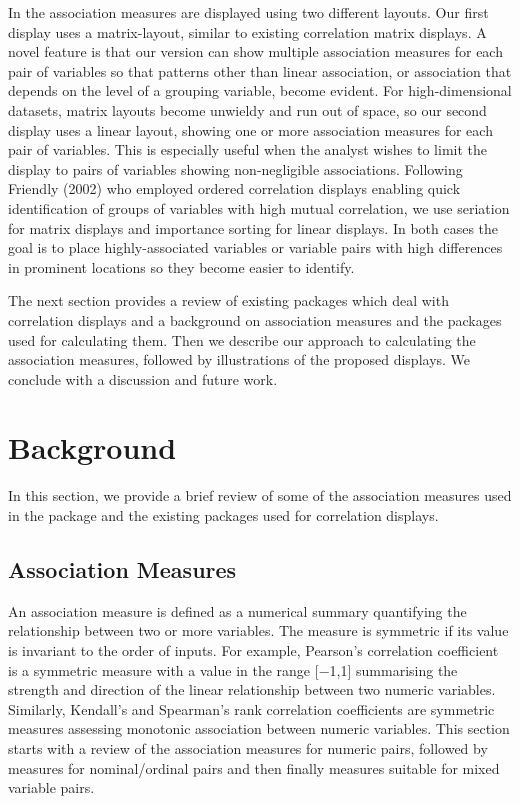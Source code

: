 In  the association measures are displayed using two different layouts. Our first display uses a matrix-layout, similar to existing correlation matrix displays. A novel feature is that our version can show multiple association measures for each pair of variables so that patterns other than linear association, or association that depends on the level of a grouping variable, become evident. For high-dimensional datasets, matrix layouts become unwieldy and run out of space, so our second display uses a linear layout, showing one or more association measures for each pair of variables. This is especially useful when the analyst wishes to limit the display to pairs of variables showing non-negligible associations.
Following Friendly (2002) who employed ordered correlation displays enabling quick identification of groups of variables with high mutual correlation, we use seriation for matrix displays and importance sorting for linear displays. In both cases the goal is to place highly-associated variables or variable pairs with high differences in prominent locations so they become easier to identify.

The next section provides a review of existing packages which deal with correlation displays and a background on association measures and the packages used for calculating them. Then we describe our approach to calculating the association measures, followed by illustrations of the proposed displays. We conclude with a discussion and future work.

\hypertarget{background}{%
\section{Background}\label{background}}

In this section, we provide a brief review of some of the association measures used in the package  and the existing packages used for correlation displays.

\hypertarget{association-measures}{%
\subsection{Association Measures}\label{association-measures}}

An association measure is defined as a numerical summary quantifying the relationship between two or more variables. The measure is symmetric if its value is invariant to the order of inputs. For example, Pearson's correlation coefficient is a symmetric measure with a value in the range {[}−1,1{]} summarising the strength and direction of the linear relationship between two numeric variables. Similarly, Kendall's and Spearman's rank correlation coefficients are symmetric measures assessing monotonic association between numeric variables. This section starts with a review of the association measures for numeric pairs, followed by measures for nominal/ordinal pairs and then finally measures suitable for mixed variable pairs.

